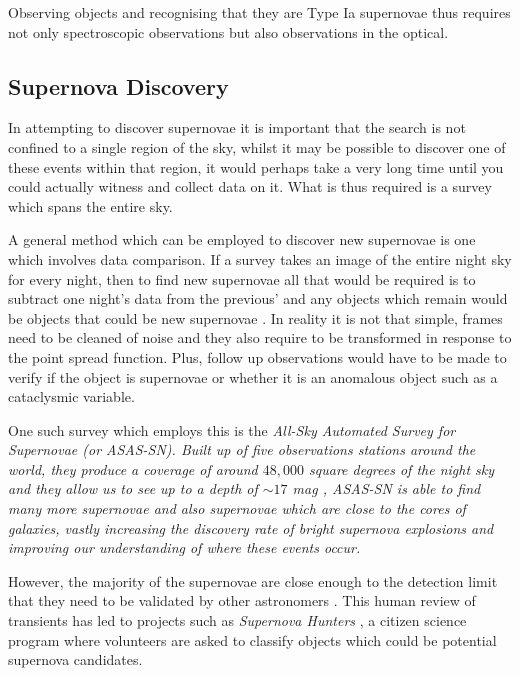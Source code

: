 \documentclass[twocolumn]{revtex4}
\begin{document}
Observing objects and recognising that they are Type Ia supernovae thus requires not only spectroscopic observations but also observations in the optical. 

\vspace{-3ex}
\subsection{Supernova Discovery}
\vspace{-2ex}
In attempting to discover supernovae it is important that the search is not confined to a single region of the sky, whilst it may be possible to discover one of these events within that region, it would perhaps take a very long time until you could actually witness and collect data on it. What is thus required is a survey which spans the entire sky. 

A general method which can be employed to discover new supernovae is one which involves data comparison. If a survey takes an image of the entire night sky for every night, then to find new supernovae all that would be required is to subtract one night's data from the previous' and any objects which remain would be objects that could be new supernovae \cite{assasn-rev}. In reality it is not that simple, frames need to be cleaned of noise and they also require to be transformed in response to the point spread function. Plus, follow up observations would have to be made to verify if the object is supernovae or whether it is an anomalous object such as a cataclysmic variable. 

One such survey which employs this is the \em{All-Sky Automated Survey for Supernovae }\em (or ASAS-SN). Built up of five observations stations around the world, they produce a coverage of around $48,000$ square degrees of the night sky and they allow us to see up to a depth of $\sim 17$ mag \cite{asn_lc}, ASAS-SN is able to find many more supernovae and also supernovae which are close to the cores of galaxies, vastly increasing the discovery rate of bright supernova explosions and improving our understanding of where these events occur.

However, the majority of the supernovae are close enough to the detection limit that they need to be validated by other astronomers \cite{asn_lc}. This human review of transients has led to projects such as \textit{Supernova Hunters} \cite{cit-sci}, a citizen science program where volunteers are asked to classify objects which could be potential supernova candidates.  
\end{document}
